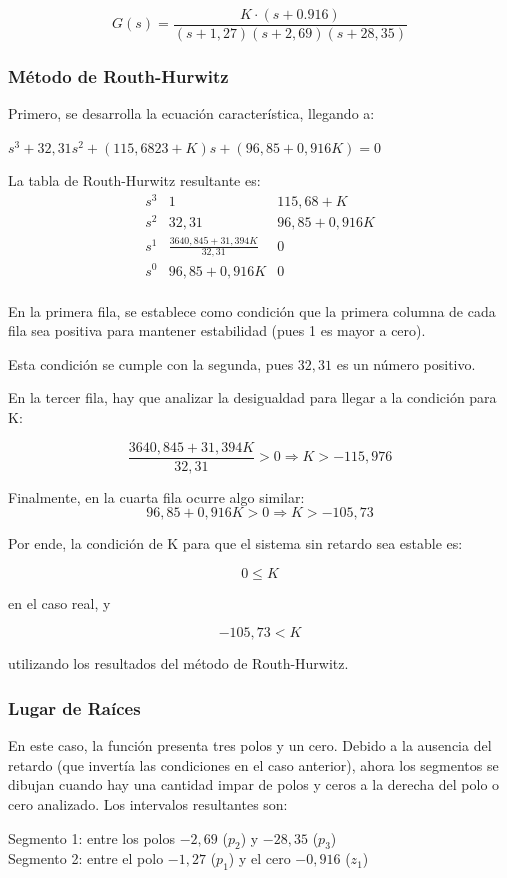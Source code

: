 \documentclass[12pt,a4paper]{article}
\begin{document}
\[
G(s) = \frac{K\cdot (s+0.916)}{(s+1,27)(s+2,69)(s+28,35)}
\]

\subsubsection*{Método de Routh-Hurwitz}

Primero, se desarrolla la ecuación característica, llegando a:

$s^3 + 32,31 s^2 + (115,6823 + K)s + (96,85 + 0,916K) = 0$

La tabla de Routh-Hurwitz resultante es:
\[
\renewcommand{\arraystretch}{1.8}
\begin{array}{c|cc}
s^3 & 1 & 115,68 + K \\
s^2 & 32,31 & 96,85 + 0,916K \\
\hline
s^1 & \frac{3640,845 + 31,394K}{32,31} & 0 \\
s^0 & 96,85 + 0,916K & 0 \\
\end{array}
\]

En la primera fila, se establece como condición que la primera columna de cada fila sea positiva para mantener estabilidad (pues 1 es mayor a cero).

Esta condición se cumple con la segunda, pues $32,31$ es un número positivo.

En la tercer fila, hay que analizar la desigualdad para llegar a la condición para K:

\[
\frac{3640,845 + 31,394K}{32,31} > 0 \Rightarrow \boxed{K>-115,976}
\]

Finalmente, en la cuarta fila ocurre algo similar:
\[
96,85+0,916K > 0 \Rightarrow \boxed{K>-105,73}
\]


Por ende, la condición de K para que el sistema sin retardo sea estable es:

\[
\boxed{0\leq K}
\]

en el caso real, y

\[
\boxed{-105,73 < K}
\]

utilizando los resultados del método de Routh-Hurwitz.

\subsubsection*{Lugar de Raíces}

En este caso, la función presenta tres polos y un cero. Debido a la ausencia del retardo (que invertía las condiciones en el caso anterior), ahora los segmentos se dibujan cuando hay una cantidad impar de polos y ceros a la derecha del polo o cero analizado.
Los intervalos resultantes son:\\
\begin{flushleft}
Segmento 1: entre los polos $-2,69$ ($p_2$) y $-28,35$ ($p_3$) \\
Segmento 2: entre el polo $-1,27$ ($p_1$) y el cero $-0,916$ ($z_1$)
\end{flushleft}
\end{document}
